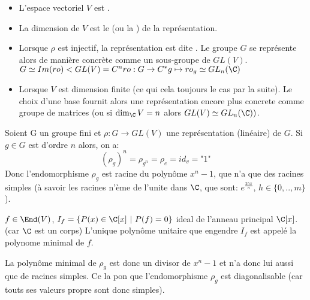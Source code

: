 \begin{definition}[Vocabulaire]	
	\leavevmode
	\begin{itemize}
		\item L'espace vectoriel $V$ est .
		\item La dimension de $V$ est le  (ou la ) de la représentation.
		\item Lorsque $\rho$ est injectif, la représentation est dite . Le groupe $G$ se représente alors de manière concrète comme un sous-groupe de $GL(V)$. $G\simeq Im(ro)<GL(V)=C^n ro:G\rightarrow C^* g\mapsto ro_g \simeq GL_n(\C)$
		\item Lorsque $V$ est dimension finite (ce qui cela toujours le cas par la suite). Le choix d'une base fournit alors une représentation encore plus concrete comme groupe de matrices (ou si $\dim_\C V=n$ alors $GL(V)\simeq GL_n(\C))$.
	\end{itemize}	
\end{definition}


\begin{remark}
	Soient G un groupe fini et $\rho:G\rightarrow GL(V)$ une représentation (linéaire) de $G$.
	Si $g\in G$ est d'ordre $n$ alors, on a:
	$$(\rho_g)^n=\rho_{g^n}=\rho_e=id_v=\text{"1"}$$
	Donc l'endomorphisme $\rho_g$ est racine du polynôme $x^n-1$, que n'a que des racines simples (à savoir les racines n'ème de l'unite dans $\C$, que sont: $e^{\frac{2h\pi}{n}}$, $h\in\{0,..,m\}$).

	\begin{rappel}	
		$f\in \End (V)$, $I_f=\{P(x)\in\C[x]\ |\ P(f)=0\}$ ideal de l'anneau principal $\C[x]$. (car $\C$ est un corps) L'unique polynôme unitaire que engendre $I_f$ est appelé la polynome minimal de $f$.
	\end{rappel}

	La polynôme minimal de $\rho_g$ est donc un divisor de $x^n-1$ et n'a donc lui aussi que de racines simples. Ce la pon que l'endomorphisme $\rho_g$ est diagonalisable (car touts ses valeurs propre sont donc simples).
\end{remark}

